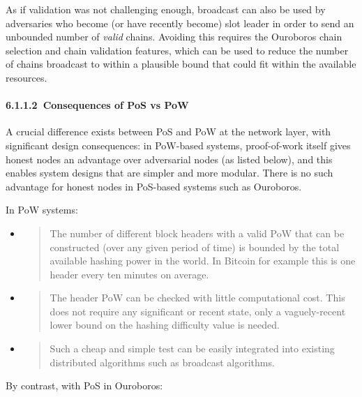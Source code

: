 \documentclass[]{article}
\let\oldparagraph\paragraph
\renewcommand{\paragraph}[1]{\oldparagraph{#1}\mbox{}}
\begin{document}
As if validation was not challenging enough, broadcast can also be used
by adversaries who become (or have recently become) slot leader in order
to send an unbounded number of \emph{valid} chains. Avoiding this
requires the Ouroboros chain selection and chain validation features,
which can be used to reduce the number of chains broadcast to within a
plausible bound that could fit within the available resources.

\hypertarget{consequences-of-pos-vs-pow}{%
\paragraph{​6.1.1.2​~Consequences of PoS vs
PoW}\label{consequences-of-pos-vs-pow}}

A crucial difference exists between PoS and PoW at the network layer,
with significant design consequences: in PoW-based systems,
proof-of-work itself gives honest nodes an advantage over adversarial
nodes (as listed below), and this enables system designs that are
simpler and more modular. There is no such advantage for honest nodes in
PoS-based systems such as Ouroboros.

In PoW systems:

\begin{itemize}
\item
  \begin{quote}
  The number of different block headers with a valid PoW that can be
  constructed (over any given period of time) is bounded by the total
  available hashing power in the world. In Bitcoin for example this is
  one header every ten minutes on average.
  \end{quote}
\item
  \begin{quote}
  The header PoW can be checked with little computational cost. This
  does not require any significant or recent state, only a
  vaguely-recent lower bound on the hashing difficulty value is needed.
  \end{quote}
\item
  \begin{quote}
  Such a cheap and simple test can be easily integrated into existing
  distributed algorithms such as broadcast algorithms.
  \end{quote}
\end{itemize}

By contrast, with PoS in Ouroboros:
\end{document}
